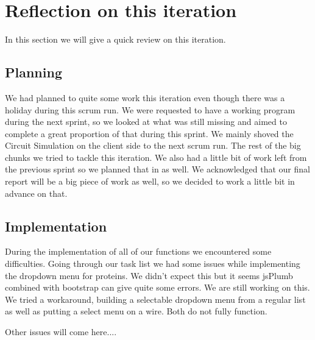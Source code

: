 \documentclass[a4paper]{article}
\begin{document}
\section{Reflection on this iteration}
In this section we will give a quick review on this iteration. \\

\subsection{Planning}
We had planned to quite some work this iteration even though there was a holiday during this scrum run. We were requested to have a working program during the next sprint, so we looked at what was still missing and aimed to complete a great proportion of that during this sprint. We mainly shoved the Circuit Simulation on the client side to the next scrum run. The rest of the big chunks we tried to tackle this iteration. We also had a little bit of work left from the previous sprint so we planned that in as well. We acknowledged that our final report will be a big piece of work as well, so we decided to work a little bit in advance on that.
 
\subsection{Implementation}
During the implementation of all of our functions we encountered some difficulties. Going through our task list we had some issues while implementing the dropdown menu for proteins. We didn't expect this but it seems jsPlumb combined with bootstrap can give quite some errors. We are still working on this.
We tried a workaround, building a selectable dropdown menu from a regular list as well as putting a select menu on a wire. Both do not fully function.

Other issues will come here....
\end{document}
